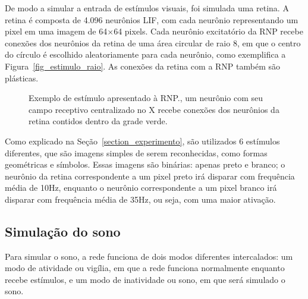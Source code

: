 De modo a simular a entrada de estímulos visuais, foi simulada uma retina. A retina é composta de 4.096 neurônios LIF, com cada
neurônio representando um pixel em uma imagem de 64$\times$64 pixels. Cada neurônio excitatório da RNP recebe conexões dos
neurônios da retina de uma área circular de raio 8, em que o centro do círculo é escolhido aleatoriamente para cada neurônio, como
exemplifica a Figura~\ref{fig_estimulo_raio}. As conexões da retina com a RNP também são plásticas.

\begin{figure}[!ht]
\caption{Exemplo de estímulo apresentado à RNP.\@Aqui, um neurônio com seu campo receptivo centralizado no X recebe conexões dos neurônios da retina contidos dentro da grade verde.}
\end{figure}

Como explicado na Seção~\ref{section_experimento}, são utilizados 6 estímulos diferentes, que são imagens simples de serem
reconhecidas, como formas geométricas e símbolos. Essas imagens são binárias: apenas preto e branco; o neurônio da retina
correspondente a um pixel preto irá disparar com frequência média de 10Hz, enquanto o neurônio correspondente a um pixel branco
irá disparar com frequência média de 35Hz, ou seja, com uma maior ativação.

\subsection{Simulação do sono}\label{subsection_sono}

Para simular o sono, a rede funciona de dois modos diferentes intercalados: um modo de atividade ou vigília, em que a rede
funciona normalmente enquanto recebe estímulos, e um modo de inatividade ou sono, em que será simulado o sono. 

